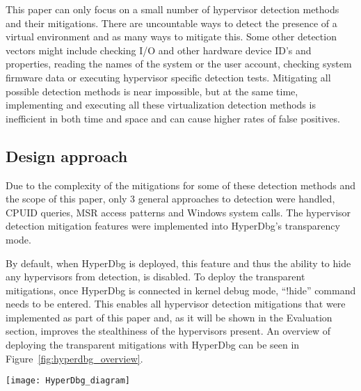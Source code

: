 This paper can only focus on a small number of hypervisor detection methods and their mitigations. There are uncountable ways to detect the presence of a virtual environment and as many ways to mitigate this.
Some other detection vectors might include checking I/O and other hardware device ID's and properties, reading the names of the system or the user account, checking system firmware data or executing hypervisor specific detection tests.
Mitigating all possible detection methods is near impossible, but at the same time, implementing and executing all these virtualization detection methods is inefficient in both time and space and can cause higher rates of false positives.


\subsection{Design approach}\label{design_approach}
Due to the complexity of the mitigations for some of these detection methods and the scope of this paper, only 3 general approaches to detection were handled, CPUID queries, MSR access patterns and Windows system calls. 
The hypervisor detection mitigation features were implemented into HyperDbg's transparency mode. 

By default, when HyperDbg is deployed, this feature and thus the ability to hide any hypervisors from detection, is disabled. To deploy the transparent mitigations, 
once HyperDbg is connected in kernel debug mode, “!hide” command needs to be entered. This enables all hypervisor detection mitigations that were implemented as part of this paper and, 
as it will be shown in the Evaluation section, improves the stealthiness of the hypervisors present. An overview of deploying the transparent mitigations with HyperDbg can be seen in Figure~\ref{fig:hyperdbg_overview}.

\begin{figure*}[t]
    \texttt{[image: HyperDbg\_diagram]} %
    \label{fig:hyperdbg_overview}
\end{figure*}


